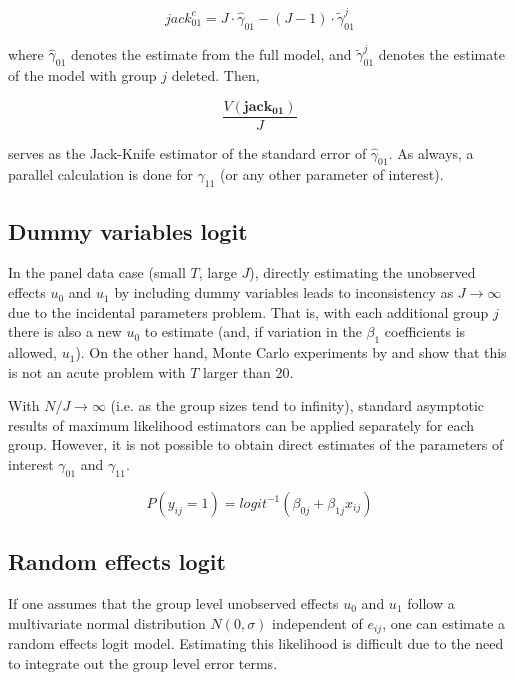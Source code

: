 \begin{equation}
  \label{eq:jack}
  jack_{01}^c=J\cdot\hat{\gamma}_{01}-(J-1)\cdot\tilde\gamma^{j}_{01}
\end{equation}

where $\hat{\gamma}_{01}$ denotes the estimate from the full model, and $\tilde\gamma_{01}^{j}$ denotes the estimate of the model with group $j$ deleted. Then,

\begin{equation}
  \label{eq:jack2}
  \frac{V(\mathbf{jack_{01}})}{J}
\end{equation}

serves as the Jack-Knife estimator of the standard error of $\hat\gamma_{01}$. As always, a parallel calculation is done for $\gamma_{11}$ (or any other parameter of interest).

\subsection{Dummy variables logit}
\label{sec:dummy-variables-logit}

In the panel data case (small $T$, large $J$), directly estimating the unobserved effects $u_0$ and $u_1$ by including dummy variables leads to inconsistency as $J \to \infty$ due to the incidental parameters problem. That is, with each additional group $j$ there is also  a new $u_0$ to estimate (and, if variation in the $\beta_1$ coefficients is allowed, $u_1$). On the other hand, Monte Carlo experiments by \citet{heckman:1981} and \citet{katz:2001} show that this is not an acute problem with $T$ larger than 20.

With $N/J \to \infty $ (i.e. as the group sizes tend to infinity), standard asymptotic results of maximum likelihood estimators can be applied separately for each group. However, it is not possible to obtain direct estimates of the parameters of interest $\gamma_{01}$ and $\gamma_{11}$.

\begin{equation}
  \label{eq:logit.group}
  P(y_{ij}=1)=logit^{-1}(\beta_{0j}+\beta_{1j} x_{ij})
\end{equation}



\subsection{Random effects logit}

If one assumes that the group level unobserved effects $u_{0}$ and $u_{1}$ follow a multivariate normal distribution $N(0,\sigma)$ independent of $e_{ij}$, one can estimate a random effects logit model.  Estimating this likelihood is difficult due to the need to integrate out  the group level error terms.


